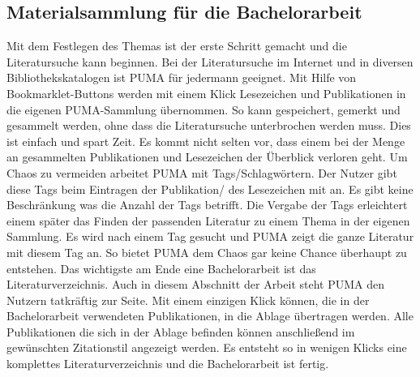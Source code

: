 \documentclass[b5paper,11pt,twoside]{scrbook} %
\begin{document}
\subsection{Materialsammlung für die Bachelorarbeit}
Mit dem Festlegen des Themas ist der erste Schritt gemacht und die Literatursuche kann beginnen. Bei der Literatursuche im Internet und in diversen Bibliothekskatalogen ist PUMA für jedermann geeignet. Mit Hilfe von Bookmarklet-Buttons werden mit einem Klick Lesezeichen und Publikationen in die eigenen PUMA-Sammlung übernommen. So kann gespeichert, gemerkt und gesammelt werden, ohne dass die Literatursuche unterbrochen werden muss. Dies ist einfach und spart Zeit. 
 \newline
Es kommt nicht selten vor, dass einem bei der Menge an gesammelten Publikationen und Lesezeichen der Überblick verloren geht. Um Chaos zu vermeiden arbeitet PUMA mit Tags/Schlagwörtern. Der Nutzer gibt diese Tags beim Eintragen der Publikation/ des Lesezeichen mit an. Es gibt keine Beschränkung was die Anzahl der Tags betrifft. Die Vergabe der Tags erleichtert einem später das Finden der passenden Literatur zu einem Thema in der eigenen Sammlung. Es wird nach einem Tag gesucht und PUMA zeigt die ganze Literatur mit diesem Tag an. So bietet PUMA dem Chaos gar keine Chance überhaupt zu entstehen. 
 \newline
Das wichtigste am Ende eine Bachelorarbeit ist das Literaturverzeichnis. Auch in diesem Abschnitt der Arbeit steht PUMA den Nutzern tatkräftig zur Seite. Mit einem einzigen Klick können, die in der Bachelorarbeit verwendeten Publikationen, in die Ablage übertragen werden. Alle Publikationen die sich in der Ablage befinden können anschließend im gewünschten Zitationstil  angezeigt werden. Es entsteht so in wenigen Klicks eine komplettes Literaturverzeichnis und die  Bachelorarbeit ist fertig.

 
\end{document}
